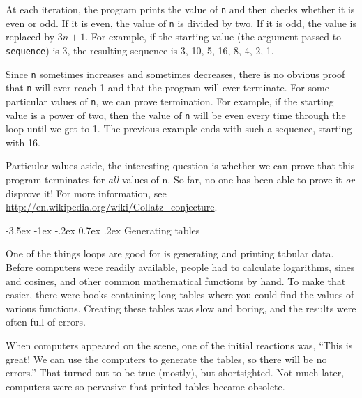 \documentclass[12pt]{book}
\makeatletter
\theoremstyle{exercise}
\newcommand{\java}[1]{\verb"#1"}
\renewcommand{\section}{\@startsection{section}{1}{\z@}%
    {-3.5ex \@plus -1ex \@minus -.2ex}%
    {0.7ex \@plus.2ex}%
    {\normalfont\Large\bfseries}}
\newcommand{\java}[1]{\lstinline{#1}} %
\makeatother
\begin{document}

At each iteration, the program prints the value of \java{n} and then checks whether it is even or odd.
If it is even, the value of \java{n} is divided by two.
If it is odd, the value is replaced by $3n+1$.
For example, if the starting value (the argument passed to \java{sequence}) is 3, the resulting sequence is 3, 10, 5, 16, 8, 4, 2, 1.

Since \java{n} sometimes increases and sometimes decreases, there is no obvious proof that \java{n} will ever reach 1 and that the program will ever terminate.
For some particular values of \java{n}, we can prove termination.
For example, if the starting value is a power of two, then the value of \java{n} will be even every time through the loop until we get to 1.
The previous example ends with such a sequence, starting with 16.

Particular values aside, the interesting question is whether we can prove that this program terminates for {\em all} values of n.
So far, no one has been able to prove it {\em or} disprove it!
For more information, see \url{http://en.wikipedia.org/wiki/Collatz_conjecture}.


\section{Generating tables}


One of the things loops are good for is generating and printing tabular data.
Before computers were readily available, people had to calculate logarithms, sines and cosines, and other common mathematical functions by hand.
To make that easier, there were books containing long tables where you could find the values of various functions.
Creating these tables was slow and boring, and the results were often full of errors.

When computers appeared on the scene, one of the initial reactions was, ``This is great!
We can use the computers to generate the tables, so there will be no errors.''
That turned out to be true (mostly), but shortsighted.
Not much later, computers were so pervasive that printed tables became obsolete.
\end{document}
